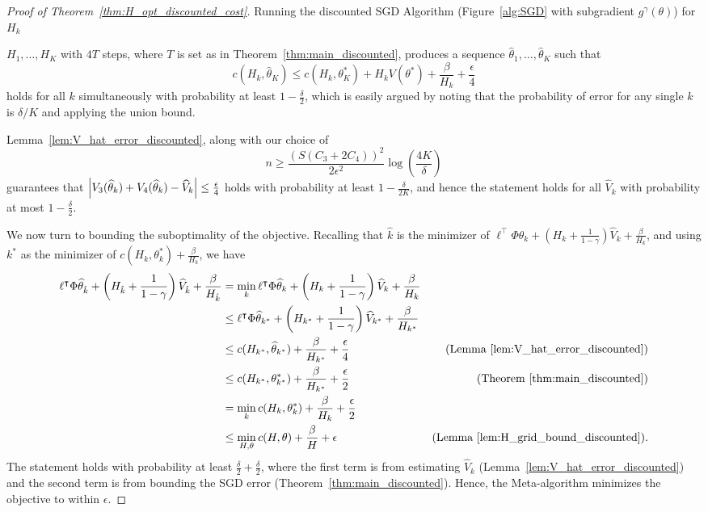 \documentclass[11pt]{article}
\begin{document}
\begin{proof}[Proof of Theorem~\ref{thm:H_opt_discounted_cost}]
  Running the discounted SGD Algorithm (Figure~\ref{alg:SGD} with subgradient $g^\gamma(\theta)$) for $H_k$


  $H_1,\ldots,H_K$ with $4T$ steps, where $T$ is set as in Theorem~\ref{thm:main_discounted},
produces a sequence $\widehat\theta_1,\ldots,\widehat\theta_K$ such that
\[
  c(H_k,\widehat\theta_K)\leq c(H_k,\theta_K^*) + H_kV(\theta^*)+ \frac{\beta}{H_k} + \frac{\epsilon}{4}
\]
holds for all $k$ simultaneously with probability at least $1-\frac{\delta}{2}$, which is easily argued by noting that the probability of error for any single $k$ is $\delta/K$ and applying the union bound.

Lemma~\ref{lem:V_hat_error_discounted}, along with our choice of
\[
    n \geq  \frac{(S(C_3 + 2C_4))^2}{2\epsilon^2}\log\left(\frac{4K}{\delta}\right)
\]
guarantees that $\abs{V_3(\widehat\theta_k)+V_4(\widehat\theta_k) -
  \widehat V_k}\leq\frac{\epsilon}{4}$
holds with probability at least $1-\frac{\delta}{2K}$, and hence the statement holds for all $\widehat V_k$ with probability at most $1-\frac{\delta}{2}$.

We now turn to bounding the suboptimality of the objective. Recalling that $\hat k$ is the minimizer of $\ell^\top\Phi\widehat\theta_{k} + \left(H_{k}+\frac{1}{1-\gamma}\right) \widehat V_k
      + \frac{\beta}{H_{k}}$, and using $k^*$ as the minimizer of
$c(H_k,\theta_k^*) + \frac{\beta}{H_k}$, we have
    \begin{align*}
      \ell^\top\Phi\widehat\theta_{\hat k} + \left(H_{\hat k}+\frac{1}{1-\gamma}\right) \widehat V_{\hat k}
      + \frac{\beta}{H_{\hat k}}
      &=
        \min_k \ell^\top\Phi\widehat\theta_{k} + \left(H_{k}+\frac{1}{1-\gamma}\right)\widehat V_k
      + \frac{\beta}{H_{k}}\\
      &\leq
        \ell^\top\Phi\widehat\theta_{k^*} + \left(H_{k^*}+\frac{1}{1-\gamma}\right) \widehat V_{k^*}
        + \frac{\beta}{H_{k^*}}\\
      &\leq
        c(H_{k^*},\widehat\theta_{k^*}) + \frac{\beta}{H_{k^*}} + \frac{\epsilon}{4}
      &\text{(Lemma~\ref{lem:V_hat_error_discounted})}\\
      &\leq
        c(H_{k^*},\theta_{k^*}^*) + \frac{\beta}{H_{k^*}}
        + \frac{\epsilon}{2}
      &\text{(Theorem~\ref{thm:main_discounted})}\\
      &=\min_k
        c(H_k,\theta_k^*) + \frac{\beta}{H_k}
        + \frac{\epsilon}{2}\\
      &\leq  \min_{H,\theta} c(H,\theta) + \frac{\beta}{H}
        + \epsilon
      &\text{(Lemma~\ref{lem:H_grid_bound_discounted})}.
    \end{align*}
    The statement holds with probability at least $\frac{\delta}{2} + \frac{\delta}{2}$, where the first term is from estimating $\widehat V_k$ (Lemma~\ref{lem:V_hat_error_discounted}) and the second term is from bounding the SGD error (Theorem~\ref{thm:main_discounted}). Hence, the Meta-algorithm minimizes the objective to within $\epsilon$.


\end{proof}
\end{document}
